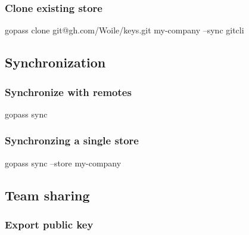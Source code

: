 \documentclass[9pt,english,a4paper,]{scrartcl}
\newenvironment{Shaded}{}{}
\newcommand{\ExtensionTok}[1]{#1}
\newcommand{\NormalTok}[1]{#1}
\begin{document}
\begin{multicols}{3}
\hypertarget{clone-existing-store}{%
\subsubsection{Clone existing store}\label{clone-existing-store}}

\begin{Shaded}
\begin{Highlighting}[]
\ExtensionTok{gopass}\NormalTok{ clone git@gh.com/Woile/keys.git my-company --sync gitcli}
\end{Highlighting}
\end{Shaded}

\hypertarget{synchronization}{%
\subsection{Synchronization}\label{synchronization}}

\hypertarget{synchronize-with-remotes}{%
\subsubsection{Synchronize with
remotes}\label{synchronize-with-remotes}}

\begin{Shaded}
\begin{Highlighting}[]
\ExtensionTok{gopass}\NormalTok{ sync}
\end{Highlighting}
\end{Shaded}

\hypertarget{synchronzing-a-single-store}{%
\subsubsection{Synchronzing a single
store}\label{synchronzing-a-single-store}}

\begin{Shaded}
\begin{Highlighting}[]
\ExtensionTok{gopass}\NormalTok{ sync --store my-company}
\end{Highlighting}
\end{Shaded}

\hypertarget{team-sharing}{%
\subsection{Team sharing}\label{team-sharing}}

\hypertarget{export-public-key}{%
\subsubsection{Export public key}\label{export-public-key}}


\end{multicols}
\end{document}
